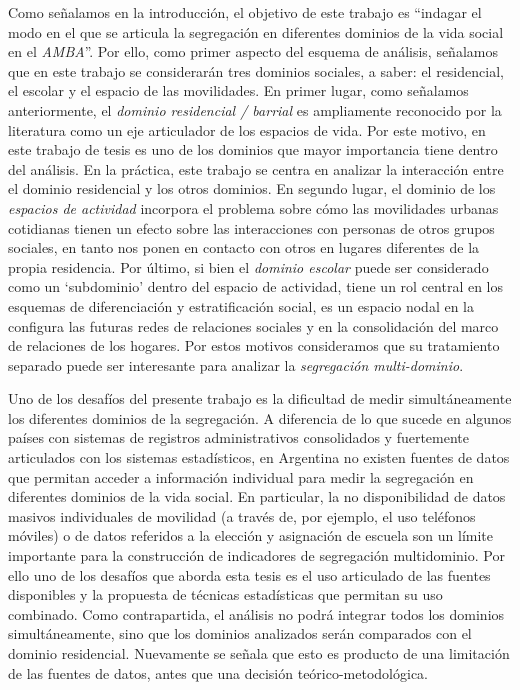 \documentclass[
  spanish,
  a4paper,%
  chapterprefix=true,%
  DIV=calc,%
  twoside]{scrbook}%
\begin{document}
Como señalamos en la introducción, el objetivo de este trabajo es
``indagar el modo en el que se articula la segregación en diferentes
dominios de la vida social en el \emph{AMBA}''. Por ello, como primer aspecto
del esquema de análisis, señalamos que en este trabajo se considerarán
tres dominios sociales, a saber: el residencial, el escolar y el espacio
de las movilidades. En primer lugar, como señalamos anteriormente, el
\emph{dominio residencial / barrial} es ampliamente reconocido por la
literatura como un eje articulador de los espacios de vida. Por este
motivo, en este trabajo de tesis es uno de los dominios que mayor
importancia tiene dentro del análisis. En la práctica, este trabajo se
centra en analizar la interacción entre el dominio residencial y los
otros dominios. En segundo lugar, el dominio de los \emph{espacios de
actividad} incorpora el problema sobre cómo las movilidades urbanas
cotidianas tienen un efecto sobre las interacciones con personas de
otros grupos sociales, en tanto nos ponen en contacto con otros en
lugares diferentes de la propia residencia. Por último, si bien el
\emph{dominio escolar} puede ser considerado como un `subdominio' dentro del
espacio de actividad, tiene un rol central en los esquemas de
diferenciación y estratificación social, es un espacio nodal en la
configura las futuras redes de relaciones sociales y en la consolidación
del marco de relaciones de los hogares. Por estos motivos consideramos
que su tratamiento separado puede ser interesante para analizar la
\emph{segregación multi-dominio}.

Uno de los desafíos del presente trabajo es la dificultad de medir
simultáneamente los diferentes dominios de la segregación. A diferencia
de lo que sucede en algunos países con sistemas de registros
administrativos consolidados y fuertemente articulados con los sistemas
estadísticos, en Argentina no existen fuentes de datos que permitan
acceder a información individual para medir la segregación en diferentes
dominios de la vida social. En particular, la no disponibilidad de datos
masivos individuales de movilidad (a través de, por ejemplo, el uso
teléfonos móviles) o de datos referidos a la elección y asignación de
escuela son un límite importante para la construcción de indicadores de
segregación multidominio. Por ello uno de los desafíos que aborda esta
tesis es el uso articulado de las fuentes disponibles y la propuesta de
técnicas estadísticas que permitan su uso combinado. Como contrapartida,
el análisis no podrá integrar todos los dominios simultáneamente, sino
que los dominios analizados serán comparados con el dominio residencial.
Nuevamente se señala que esto es producto de una limitación de las
fuentes de datos, antes que una decisión teórico-metodológica.
\end{document}
